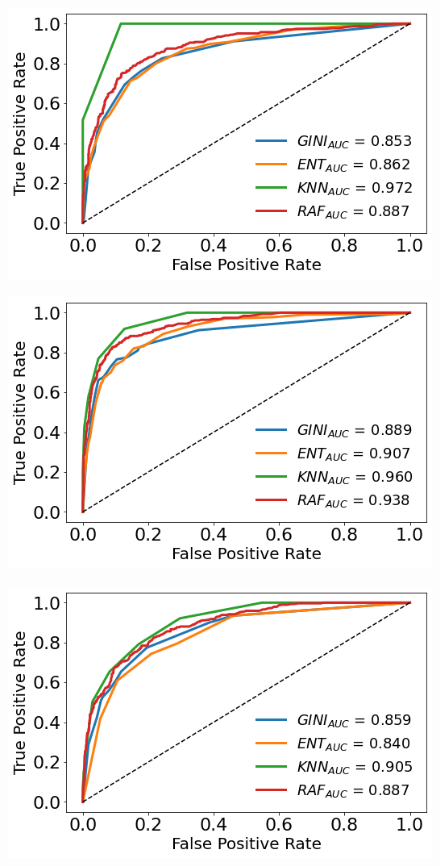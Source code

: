 \documentclass[a4paper,11pt,dvipsnames]{article}
\begin{document}
\begin{figure}[h]
\centering
\begin{minipage}[b]{.3\linewidth}
\centering\large \includegraphics[width=0.8\linewidth]{arousal_ROC_c.png}
\label{fig:arroc}
\end{minipage}%
    \hfil
\begin{minipage}[b]{.3\linewidth}
\centering\includegraphics[width=0.8\linewidth]{valence_ROC_c.png}\label{fig:valroc}
\end{minipage}    \hfil
\begin{minipage}[b]{.3\linewidth}
\centering\includegraphics[width=0.8\linewidth]{dominance_ROC_c.png}\label{fig:domroc}
\end{minipage}


\end{figure}
\end{document}
